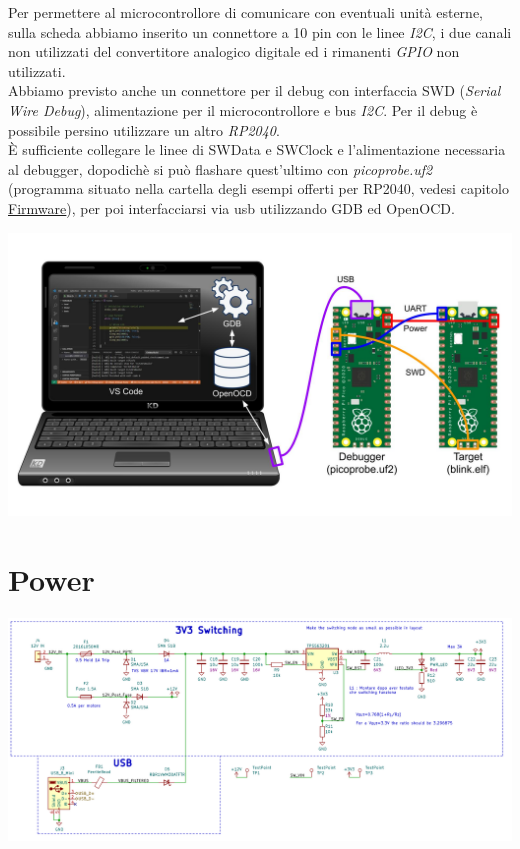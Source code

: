 \noindent Per permettere al microcontrollore di comunicare con eventuali unità
esterne, sulla scheda abbiamo inserito un connettore a 10 pin con le
linee \emph{I2C}, i due canali non utilizzati del convertitore analogico
digitale ed i rimanenti \emph{GPIO} non utilizzati.\\
Abbiamo previsto anche un connettore per il debug con interfaccia SWD
(\emph{Serial Wire Debug}), alimentazione per il microcontrollore e bus
\emph{I2C}. Per il debug è possibile persino utilizzare un altro \emph{RP2040}.\\
È sufficiente collegare le linee di SWData e
SWClock e l'alimentazione necessaria al debugger,
dopodichè si può flashare quest'ultimo con \emph{picoprobe.uf2}
(programma situato nella cartella degli esempi offerti per RP2040,
vedesi capitolo
\protect\hyperlink{_w8kvxnysumpc}{\underline{Firmware}}), per poi
interfacciarsi via usb utilizzando GDB ed OpenOCD.

\begin{center}
\includegraphics[scale=0.2]{figures/image18.png}
\captionsetup{type=figure}
\end{center}

\hypertarget{power}{%
\section{Power}\label{power}}

\begin{center}
\includegraphics[scale=0.45]{figures/image65.png}
\captionsetup{type=figure}
\end{center}

